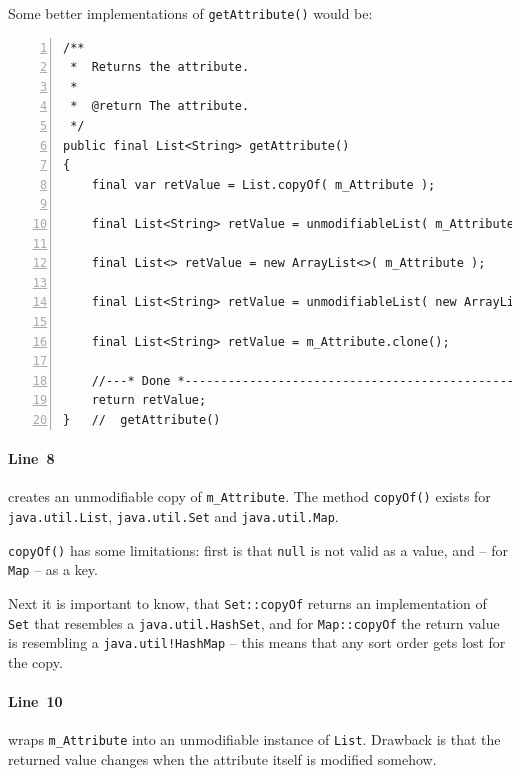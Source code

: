 \documentclass[11pt,a4paper, titlepage, parskip=half, headsepline, footsepline, cleardoublepage=current, headheight=1cm]{scrbook}
\begin{document}
Some better implementations of \lstinline|getAttribute()| would be:
\begin{lstlisting}[numbers=left]
/**
 *  Returns the attribute.
 * 
 *  @return The attribute.
 */ 
public final List<String> getAttribute() 
{ 
	final var retValue = List.copyOf( m_Attribute );
	
	final List<String> retValue = unmodifiableList( m_Attribute );
	
	final List<> retValue = new ArrayList<>( m_Attribute );
	
	final List<String> retValue = unmodifiableList( new ArrayList<>( m_Attribute ) );
	
	final List<String> retValue = m_Attribute.clone();

    //---* Done *----------------------------------------------------
    return retValue;
}   //  getAttribute()
\end{lstlisting}

\paragraph{Line~8} creates an unmodifiable copy of \lstinline|m_Attribute|. The method \lstinline|copyOf()| exists for \lstinline|java.util.List|\autocite{ORACLE_DOC_LIST:copyOf}, \lstinline|java.util.Set|\autocite{ORACLE_DOC_SET:copyOf} and \lstinline|java.util.Map|\autocite{ORACLE_DOC_MAP:copyOf}.

\lstinline|copyOf()| has some limitations: first is that \lstinline|null| is not valid as a value, and – for \lstinline|Map| – as a key.

Next it is important to know, that \lstinline|Set::copyOf| returns an implementation of \lstinline|Set| that resembles a \lstinline|java.util.HashSet|\autocite{ORACLE_DOC_HASHSET_CLASS}, and for \lstinline|Map::copyOf| the return value is resembling a \lstinline|java.util!HashMap|\autocite{ORACLE_DOC_HASHMAP_CLASS} – this means that any sort order gets lost for the copy.

\paragraph{Line~10} wraps \lstinline|m_Attribute| into an unmodifiable instance of \lstinline|List|. Drawback is that the returned value changes when the attribute itself is modified somehow.
\end{document}
